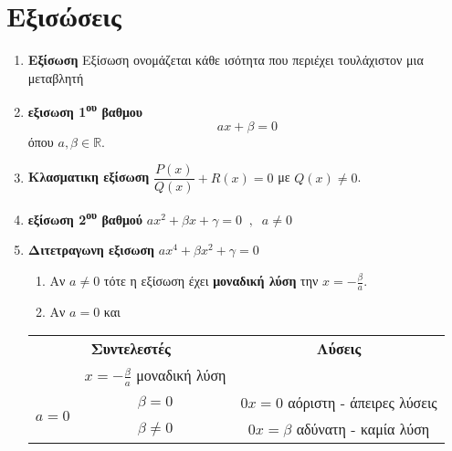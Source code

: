 \documentclass[twoside,nofonts,internet,shmeiwseis]{thewria}
\begin{document}
\section{Εξισώσεις}
\begin{enumerate}
\item \textbf{Εξίσωση}
Εξίσωση ονομάζεται κάθε ισότητα που περιέχει τουλάχιστον μια μεταβλητή
\item \textbf{εξισωση 1\textsuperscript{\MakeLowercase{ου}} βαθμου} \[ ax+\beta=0 \]
όπου $ a,\beta\in\mathbb{R} $.\\
\item \textbf{Κλασματικη εξίσωση}
$ \dfrac{P(x)}{Q(x)}+R(x)= 0 $ με $ Q(x)\neq0 $.
\item \textbf{εξίσωση 2\textsuperscript{\MakeLowercase{ου}} βαθμού} $ ax^2+\beta x+\gamma=0\;\;,\;\;a\neq0 $
\item \textbf{Διτετραγωνη εξισωση} $ ax^4+\beta x^2+\gamma=0 $
\thewrhmata
{}
\begin{enumerate}
\item Αν $ a\neq0 $ τότε η εξίσωση έχει \textbf{μοναδική λύση} την $ x=-\frac{\beta}{a} $.
\item Αν $ a=0 $ και 
\end{enumerate}
\begin{center}
\begin{tabular}{c|c|c}
\hline\multicolumn{2}{c}{\textbf{Συντελεστές}} & \textbf{Λύσεις} \rule[-2ex]{0pt}{5.5ex}\\ 
\hhline{===}  \multicolumn{2}{c}{$a\neq0$} &  $ x=-\frac{\beta}{a} $ μοναδική λύση \rule[-2ex]{0pt}{5.5ex}\\ 
\hline \multirow{3}{*}{$a=0$}  & $ \beta=0 $ & $ 0x=0 $ αόριστη - άπειρες λύσεις \rule[-2ex]{0pt}{5.5ex}\\
\hhline{~--} \rule[-2ex]{0pt}{5.5ex}   & $ \beta\neq0 $ & $ 0x=\beta $ αδύνατη - καμία λύση \\ 
\hline 
\end{tabular}
\end{center}

\end{enumerate}
\end{document}
